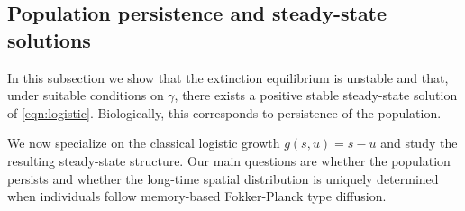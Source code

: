 \documentclass{article}
\begin{document}




\subsection{Population persistence and steady-state solutions}
In this subsection we show that the extinction equilibrium is unstable and that, under suitable conditions on $\gamma$, there exists a positive stable steady-state solution of \eqref{eqn:logistic}. Biologically, this corresponds to persistence of the population.

We now specialize on the classical logistic growth $g(s,u)=s-u$ and study the resulting steady-state structure. Our main questions are whether the population persists and whether the long-time spatial distribution is uniquely determined when individuals follow memory-based Fokker-Planck type diffusion.
\end{document}
